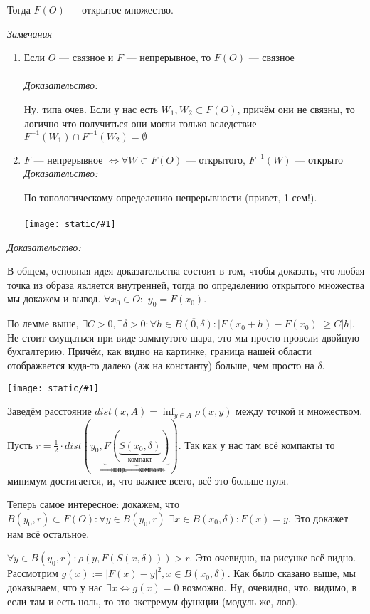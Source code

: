 \documentclass{article}
\def\dbl{\,\,}
\def\image#1{\texttt{[image: static/\#1]}}
\begin{document}
Тогда $F(O)$ --- открытое множество.

\textit{Замечания}
\begin{enumerate}
    \item Если $O$ --- связное и $F$ --- непрерывное, то $F(O)$ --- связное\\\\
    \textit{Доказательство:}

    Ну, типа очев. Если у нас есть $W_1, W_2 \subset F(O)$, причём они не связны, то логично что получиться они могли только вследствие $F^{-1}(W_1) \cap F^{-1}(W_2) = \emptyset$
    \item $F$ --- непрерывное $\Leftrightarrow \forall W \subset F(O)$ --- открытого, $F^{-1}(W)$ --- открыто
    \textit{Доказательство:}

    По топологическому определению непрерывности (привет, 1 сем!).\\\\
    \image{sohr_obl_1.png}
\end{enumerate}


\textit{Доказательство:}

В общем, основная идея доказательства состоит в том, чтобы доказать, что любая точка из образа является внутренней, тогда по определению открытого множества мы докажем и вывод.
$\forall x_0 \in O: \dbl y_0 = F(x_0)$. 

По лемме выше, $\exists C > 0, \exists \delta > 0: \forall h \in \overline{B(0, \delta)}: |F(x_0 + h) - F(x_0)| \ge C|h|$. Не стоит смущаться при виде замкнутого шара, это мы просто провели двойную бухгалтерию. Причём, как видно на картинке, граница нашей области отображается куда-то далеко (аж на константу) больше, чем просто на $\delta$.

\image{sohr_obl_2.png}

Заведём расстояние $dist(x, A) = \inf_{y \in A} \rho(x, y)$ между точкой и множеством. Пусть $r = \frac{1}{2} \cdot dist(y_0, \underbrace{F(\underbrace{S(x_0, \delta)}_{\text{компакт}})}_{\text{непр. } \Rightarrow \text{ компакт}})$. Так как у нас там всё компакты то минимум достигается, и, что важнее всего, всё это больше нуля.

Теперь самое интересное: докажем, что $B(y_0, r) \subset F(O): \forall y \in B(y_0, r) \dbl \exists x \in B(x_0, \delta): F(x) = y$. Это докажет нам всё остальное.

$\forall y \in B(y_0, r): \rho(y, F(S(x, \delta))) > r$. Это очевидно, на рисунке всё видно. Рассмотрим $g(x) := |F(x) - y|^2, x \in B(x_0, \delta)$. Как было сказано выше, мы доказываем, что у нас $\exists x \Leftrightarrow g(x) = 0$ возможно. Ну, очевидно, что, видимо, в если там и есть ноль, то это экстремум функции (модуль же, лол).
\end{document}
